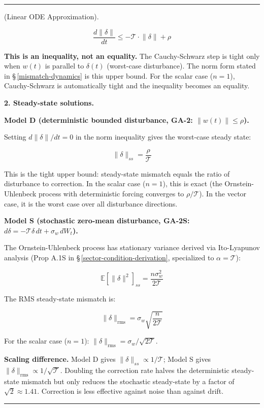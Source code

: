 \documentclass[11pt,oneside]{article}
\newcounter{claim}[section]
\renewcommand{\theclaim}{\thesection.\arabic{claim}}
\newenvironment{segment}[2]{%
  \refstepcounter{claim}%
  \bigskip\noindent\hrule\smallskip
  \noindent{\bfseries #1~\theclaim}\enskip(#2).\par\smallskip
  \noindent\ignorespaces
}{%
  \par\smallskip\noindent\hrule\bigskip
}
\newenvironment{detail}[1][]{\begin{segment}{Detail}{#1}}{\end{segment}}
\begin{document}
\begin{detail}[Linear ODE Approximation]

$$\frac{d\lVert\delta\rVert}{dt} \leq -\mathcal{T} \cdot \lVert\delta\rVert + \rho$$

\textbf{This is an inequality, not an equality.} The Cauchy-Schwarz step is tight only when $w(t)$ is parallel to $\delta(t)$ (worst-case disturbance). The norm form stated in \S\,\ref{mismatch-dynamics} is this upper bound. For the scalar case ($n = 1$), Cauchy-Schwarz is automatically tight and the inequality becomes an equality.


\medskip\noindent\textbf{2. Steady-state solutions.}



\medskip\noindent\textbf{Model D (deterministic bounded disturbance, GA-2: $\lVert w(t)\rVert \leq \rho$).}


Setting $d\lVert\delta\rVert/dt = 0$ in the norm inequality gives the worst-case steady state:


$$\lVert\delta\rVert_{ss} = \frac{\rho}{\mathcal{T}}$$

This is the tight upper bound: steady-state mismatch equals the ratio of disturbance to correction. In the scalar case ($n = 1$), this is exact (the Ornstein-Uhlenbeck process with deterministic forcing converges to $\rho/\mathcal{T}$). In the vector case, it is the worst case over all disturbance directions.


\medskip\noindent\textbf{Model S (stochastic zero-mean disturbance, GA-2S: $d\delta = -\mathcal{T}\delta\,dt + \sigma_w\,dW_t$).}


The Ornstein-Uhlenbeck process has stationary variance derived via Ito-Lyapunov analysis (Prop A.1S in \S\,\ref{sector-condition-derivation}, specialized to $\alpha = \mathcal{T}$):


$$\mathbb{E}[\lVert\delta\rVert^2]_{ss} = \frac{n\sigma_w^2}{2\mathcal{T}}$$

The RMS steady-state mismatch is:

$$\lVert\delta\rVert_{\text{rms}} = \sigma_w\sqrt{\frac{n}{2\mathcal{T}}}$$

For the scalar case ($n = 1$): $\lVert\delta\rVert_{\text{rms}} = \sigma_w / \sqrt{2\mathcal{T}}$.

\textbf{Scaling difference.} Model D gives $\lVert\delta\rVert_{ss} \propto 1/\mathcal{T}$; Model S gives $\lVert\delta\rVert_{\text{rms}} \propto 1/\sqrt{\mathcal{T}}$. Doubling the correction rate halves the deterministic steady-state mismatch but only reduces the stochastic steady-state by a factor of $\sqrt{2} \approx 1.41$. Correction is less effective against noise than against drift.



\end{detail}
\end{document}
